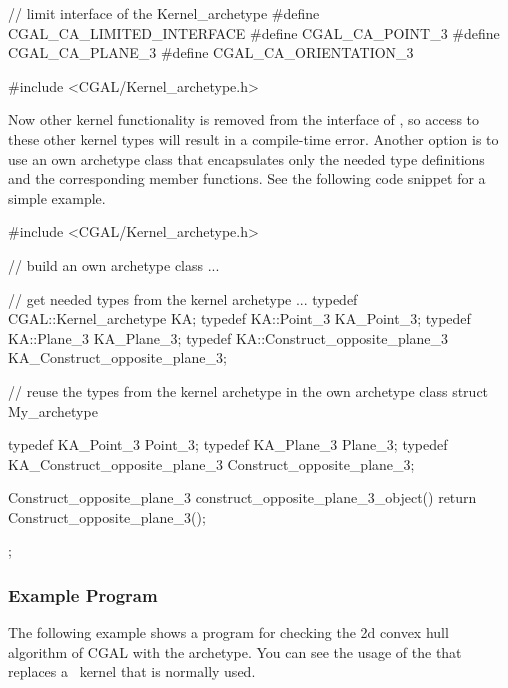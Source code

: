 \ccHtmlLinksOff

\begin{ccExampleCode}
// limit interface of the Kernel_archetype
#define CGAL_CA_LIMITED_INTERFACE
#define CGAL_CA_POINT_3
#define CGAL_CA_PLANE_3
#define CGAL_CA_ORIENTATION_3

#include <CGAL/Kernel_archetype.h>
\end{ccExampleCode}

\ccHtmlLinksOn

Now other kernel functionality is removed from the interface of
, so access to these other kernel types will result
in a compile-time error.
Another option is to use an own archetype class that encapsulates only the 
needed type definitions and the corresponding member functions. 
See the following code snippet for a simple example.

\ccHtmlLinksOff

\begin{ccExampleCode}
#include <CGAL/Kernel_archetype.h>

// build an own archetype class ...

// get needed types from the kernel archetype ...
typedef CGAL::Kernel_archetype           KA;
typedef KA::Point_3                      KA_Point_3;
typedef KA::Plane_3                      KA_Plane_3;
typedef KA::Construct_opposite_plane_3   KA_Construct_opposite_plane_3;

// reuse the types from the kernel archetype in the own archetype class
struct My_archetype {
  typedef KA_Point_3                    Point_3;
  typedef KA_Plane_3                    Plane_3;
  typedef KA_Construct_opposite_plane_3 Construct_opposite_plane_3;
  
  Construct_opposite_plane_3
  construct_opposite_plane_3_object()
  { return Construct_opposite_plane_3(); }
};
\end{ccExampleCode}

\ccHtmlLinksOn

\subsubsection{Example Program}

The following example shows a program for checking the 2d convex hull algorithm
of CGAL with the archetype. You can see the usage of the
 that replaces a \cgal\ kernel that is normally used.

\ccHtmlLinksOff

